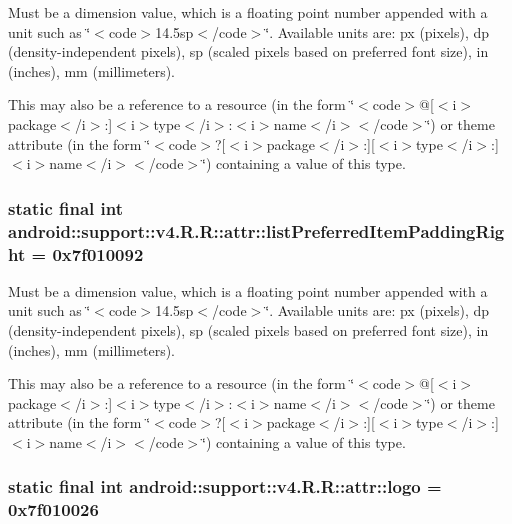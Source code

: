 Must be a dimension value, which is a floating point number appended with a unit such as \char`\"{}$<$code$>$14.5sp$<$/code$>$\char`\"{}. Available units are: px (pixels), dp (density-independent pixels), sp (scaled pixels based on preferred font size), in (inches), mm (millimeters). 

This may also be a reference to a resource (in the form \char`\"{}$<$code$>$@\mbox{[}$<$i$>$package$<$/i$>$:\mbox{]}$<$i$>$type$<$/i$>$:$<$i$>$name$<$/i$>$$<$/code$>$\char`\"{}) or theme attribute (in the form \char`\"{}$<$code$>$?\mbox{[}$<$i$>$package$<$/i$>$:\mbox{]}\mbox{[}$<$i$>$type$<$/i$>$:\mbox{]}$<$i$>$name$<$/i$>$$<$/code$>$\char`\"{}) containing a value of this type. \hypertarget{classandroid_1_1support_1_1v4_1_1_r_1_1attr_96ad82cf1792f137a9a3b8c1fcac32e0}{
\subsubsection[{listPreferredItemPaddingRight}]{\setlength{\rightskip}{0pt plus 5cm}static final int android::support::v4.R.R::attr::listPreferredItemPaddingRight = 0x7f010092}}
\label{classandroid_1_1support_1_1v4_1_1_r_1_1attr_96ad82cf1792f137a9a3b8c1fcac32e0}


Must be a dimension value, which is a floating point number appended with a unit such as \char`\"{}$<$code$>$14.5sp$<$/code$>$\char`\"{}. Available units are: px (pixels), dp (density-independent pixels), sp (scaled pixels based on preferred font size), in (inches), mm (millimeters). 

This may also be a reference to a resource (in the form \char`\"{}$<$code$>$@\mbox{[}$<$i$>$package$<$/i$>$:\mbox{]}$<$i$>$type$<$/i$>$:$<$i$>$name$<$/i$>$$<$/code$>$\char`\"{}) or theme attribute (in the form \char`\"{}$<$code$>$?\mbox{[}$<$i$>$package$<$/i$>$:\mbox{]}\mbox{[}$<$i$>$type$<$/i$>$:\mbox{]}$<$i$>$name$<$/i$>$$<$/code$>$\char`\"{}) containing a value of this type. \hypertarget{classandroid_1_1support_1_1v4_1_1_r_1_1attr_b1e60b9e93763a4a4de8e84d8385b114}{
\subsubsection[{logo}]{\setlength{\rightskip}{0pt plus 5cm}static final int android::support::v4.R.R::attr::logo = 0x7f010026}}
\label{classandroid_1_1support_1_1v4_1_1_r_1_1attr_b1e60b9e93763a4a4de8e84d8385b114}


